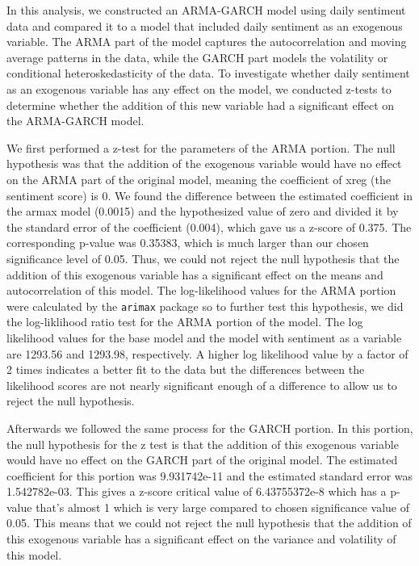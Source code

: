 \documentclass[12pt, letterpaper, titlepage]{article}
\begin{document}
In this analysis, we constructed an ARMA-GARCH model using daily sentiment data and compared it to a model that included daily sentiment as an exogenous variable. The ARMA part of the model captures the autocorrelation and moving average patterns in the data, while the GARCH part models the volatility or conditional heteroskedasticity of the data. To investigate whether daily sentiment as an exogenous variable has any effect on the model, we conducted z-tests to determine whether the addition of this new variable had a significant effect on the ARMA-GARCH model.

We first performed a z-test for the parameters of the ARMA portion. The null hypothesis was that the addition of the exogenous variable would have no effect on the ARMA part of the original model, meaning the coefficient of xreg (the sentiment score) is 0. We found the difference between the estimated coefficient in the armax model (0.0015) and the hypothesized value of zero and divided it by the standard error of the coefficient (0.004), which gave us a z-score of 0.375. The corresponding p-value was 0.35383, which is much larger than our chosen significance level of 0.05. Thus, we could not reject the null hypothesis that the addition of this exogenous variable has a significant effect on the means and autocorrelation of this model.  The log-likelihood values for the ARMA portion were calculated by the \texttt{arimax} package so to further test this hypothesis, we did the log-liklihood ratio test for the ARMA portion of the model. The log likelihood values for the base model and the model with sentiment as a variable are 1293.56 and 1293.98, respectively. A higher log likelihood value by a factor of 2 times indicates a better fit to the data but the differences between the likelihood scores are not nearly significant enough of a difference to allow us to reject the null hypothesis.

Afterwards we followed the same process for the GARCH portion. In this portion, the null hypothesis for the z test is that the addition of this exogenous variable would have no effect on the GARCH part of the original model. The estimated coefficient for this portion was 9.931742e-11  and the estimated standard error was 1.542782e-03. This gives a z-score critical value of 6.43755372e-8 which has a p-value that's almost 1 which is very large compared to chosen significance value of 0.05. This means that we could not reject the null hypothesis that the addition of this exogenous variable has a significant effect on the variance and volatility of this model. 
\end{document}
